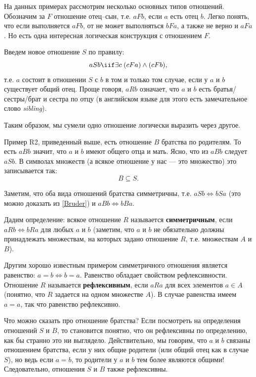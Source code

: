 \begin{enumerate}
На данных примерах рассмотрим несколько основных типов отношений. Обозначим за $F$ отношение отец--сын, т.е. $aFb$, если $a$ есть отец $b$. Легко понять, что если выполняется $aFb$, от не может выполняться $bFa$, а также не верно и $aFa$. Но есть одна интересная логическая конструкция с отношением $F$.

Введем новое отношение $S$ по правилу:
\begin{equation}\label{Bruder}
aSb \iif \exists c\;(cFa)\land(cFb),
\end{equation}
т.е. $a$ состоит в отношении $S$ с $b$ в том и только том случае, если у $a$ и $b$ существует общий отец. Проще говоря, $aRb$ означает, что $a$ и $b$ есть братья/сестры/брат и сестра по отцу (в английском языке для этого есть замечательное слово \textit{sibling}).

Таким образом, мы сумели одно отношение логически выразить через другое.

Пример R2, приведенный выше, есть отношение $B$ братства по родителям. То есть $aBb$ значит, что $a$ и $b$ имеют общего отца и мать. Ясно, что из $aBb$ следует $aSb$. В символах множеств (а всякое отношение у нас --- это множество) это записывается так:
$$
B\subseteq S.
$$

Заметим, что оба вида отношений братства симметричны, т.е. $aSb\Leftrightarrow bSa$ (это можно доказать из \eqref{Bruder}) и $aBb\Leftrightarrow bBa$.

Дадим определение: всякое отношение $R$ называется \textbf{симметричным}, если $aRb\Leftrightarrow bRa$ для любых $a$ и $b$ (заметим, что $a$ и $b$ не обязательно должны принадлежать множествам, на которых задано отношение $R$, т.е. множествам $A$ и $B$).

Другим хорошо известным примером симметричного отношения является равенство: $a=b\Leftrightarrow b=a$. Равенство обладает свойством рефлексивности. Отношение $R$ называется \textbf{рефлексивным}, если $aRa$ для всех элементов $a\in A$ (понятно, что $R$ задается на одном множестве $A$). В случае равенства имеем $a=a$, так что равенство рефлексивно. 

Что можно сказать про отношение братства? Если посмотреть на определения отношений $S$ и $B$, то становится понятно, что он рефлексивны по определению, как бы странно это ни выглядело. Действительно, мы говорим, что $a$ и $b$ связаны отношением братства, если у них общие родители (или общий отец как в случае $S$), но ведь если $a=b$, то родители у $a$ и $b$ тем более являются общими! Следовательно, отношения $S$ и $B$ также рефлексивны.


\end{enumerate}
